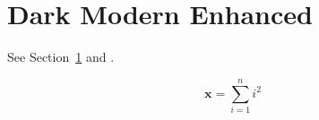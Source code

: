 \documentclass{article}
\newcommand{\vect}[1]{\mathbf{#1}}
\begin{document}
\section{Dark Modern Enhanced}\label{sec:theme}
See Section~\ref{sec:theme} and \cite{example2026}.

\[
    \vect{x} = \sum_{i=1}^{n} i^2
\]
\end{document}
